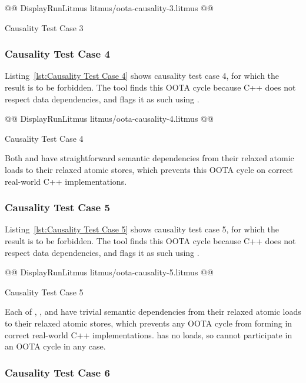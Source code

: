 \documentclass[10]{article}
\begin{document}
\begin{listing}[tbp]
@@ DisplayRunLitmus litmus/oota-causality-3.litmus @@
\caption{Causality Test Case 3}
\label{lst:Causality Test Case 3}
\end{listing}

\subsubsection{Causality Test Case 4}
\label{app:Causality Test Case 4}

Listing~\ref{lst:Causality Test Case 4}
shows causality test case 4, for which the  result
is to be forbidden.
The  tool finds this OOTA cycle because C++ does not respect
data dependencies, and flags it as such using .

\begin{listing}[tbp]
@@ DisplayRunLitmus litmus/oota-causality-4.litmus @@
\caption{Causality Test Case 4}
\label{lst:Causality Test Case 4}
\end{listing}

Both  and  have straightforward semantic dependencies
from their relaxed atomic loads to their relaxed atomic stores, which
prevents this OOTA cycle on correct real-world C++ implementations.

\subsubsection{Causality Test Case 5}
\label{app:Causality Test Case 5}

Listing~\ref{lst:Causality Test Case 5}
shows causality test case 5, for which the 
result is to be forbidden.
The  tool finds this OOTA cycle because C++ does not respect
data dependencies, and flags it as such using .

\begin{listing}[tbp]
@@ DisplayRunLitmus litmus/oota-causality-5.litmus @@
\caption{Causality Test Case 5}
\label{lst:Causality Test Case 5}
\end{listing}

Each of , , and  have trivial semantic
dependencies from their relaxed atomic loads to their relaxed
atomic stores, which prevents any OOTA cycle from forming in correct
real-world C++ implementations.
 has no loads, so cannot participate in an OOTA cycle in
any case.

\subsubsection{Causality Test Case 6}
\label{app:Causality Test Case 6}
\end{document}
